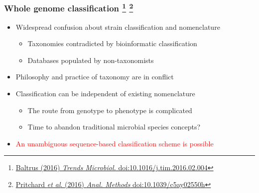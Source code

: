 \begin{frame}
  \frametitle{Whole genome classification
  \footnote{\tiny{\href{http://dx.doi.org/10.1016/j.tim.2016.02.004}{Baltrus (2016) \textit{Trends Microbiol.} doi:10.1016/j.tim.2016.02.004}}}
    \footnote{\tiny{\href{http://dx.doi.org/10.1039/c5ay02550h}{Pritchard \textit{et al}. (2016) \textit{Anal. Methods} doi:10.1039/c5ay02550h}}}
  }
      \begin{itemize}  
        \item \textcolor{hutton_green}{Widespread confusion about strain classification and nomenclature}
          \begin{itemize}
            \item Taxonomies contradicted by bioinformatic classification
            \item Databases populated by non-taxonomists
          \end{itemize}
        \item \textcolor{hutton_blue}{Philosophy and practice of taxonomy are in conflict}
        \item \textcolor{hutton_purple}{Classification can be independent of existing nomenclature}
          \begin{itemize}
            \item The route from genotype to phenotype is complicated
            \item Time to abandon traditional microbial species concepts?
          \end{itemize}
          \item \textcolor{red}{An unambiguous sequence-based classification scheme is possible}
        \end{itemize}  
\end{frame}


